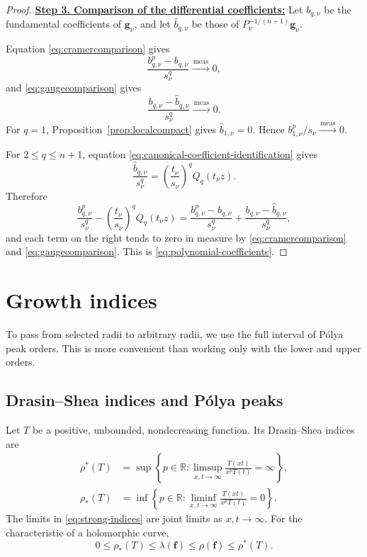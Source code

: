 \documentclass[12pt,letterpaper,reqno]{amsart}
\theoremstyle{definition}
\numberwithin{equation}{section}
\newcommand{\R}{\mathbb R}
\newcommand{\convmeas}{\xrightarrow{\,\mathrm{meas}\,}}
\newcommand{\fv}{\bm f}
\newcommand{\gv}{\bm g}
\begin{document}
\begin{proof}
\medskip\noindent
\textbf{\underline{Step 3. Comparison of the differential coefficients:}}
Let \(b_{q,\nu}\) be the fundamental coefficients of \(\gv_\nu\), and
let \(\widehat b_{q,\nu}\) be those of
\(P_\nu^{-1/(n+1)}\gv_\nu\).

Equation \eqref{eq:cramercomparison} gives
\[
 \frac{b_{q,\nu}^p-b_{q,\nu}}{s_\nu^q}
 \convmeas0,
\]
and \eqref{eq:gaugecomparison} gives
\[
 \frac{b_{q,\nu}-\widehat b_{q,\nu}}{s_\nu^q}
 \convmeas0.
\]
For \(q=1\), Proposition~\ref{prop:localcompact} gives
\(\widehat b_{1,\nu}=0\). Hence
\(b_{1,\nu}^p/s_\nu\convmeas0\).

For \(2\leq q\leq n+1\), equation
\eqref{eq:canonical-coefficient-identification} gives
\[
 \frac{\widehat b_{q,\nu}}{s_\nu^q}
 =
 \left(\frac{t_\nu}{s_\nu}\right)^qQ_q(t_\nu z).
\]
Therefore
\[
 \frac{b_{q,\nu}^p}{s_\nu^q}
 -
 \left(\frac{t_\nu}{s_\nu}\right)^qQ_q(t_\nu z)
 =
 \frac{b_{q,\nu}^p-b_{q,\nu}}{s_\nu^q}
 +
 \frac{b_{q,\nu}-\widehat b_{q,\nu}}{s_\nu^q},
\]
and each term on the right tends to zero in measure by
\eqref{eq:cramercomparison} and \eqref{eq:gaugecomparison}. This is
\eqref{eq:polynomial-coefficients}.
\end{proof}
\section{Growth indices}\label{sec:indices}

To pass from selected radii to arbitrary radii, we use the full interval
of P\'olya peak orders. This is more convenient than working only with
the lower and upper orders.

\subsection{Drasin--Shea indices and P\'olya peaks}
\label{sec:polya-peaks}

Let \(T\) be a positive, unbounded, nondecreasing function. Its
Drasin--Shea indices \cite{DS72} are
\begin{equation}\label{eq:strong-indices}
\begin{split}
 \rho^*(T)
 &=
 \sup\left\{
 p\in\R:
 \limsup_{x,t\to\infty}
 \frac{T(xt)}{x^pT(t)}
 =
 \infty
 \right\},\\
 \rho_*(T)
 &=
 \inf\left\{
 p\in\R:
 \liminf_{x,t\to\infty}
 \frac{T(xt)}{x^pT(t)}
 =
 0
 \right\}.
\end{split}
\end{equation}
The limits in \eqref{eq:strong-indices} are joint limits as
\(x,t\to\infty\). For the characteristic of a holomorphic curve,
\[
0\leq
\rho_*(T)
\leq
\lambda(\fv)
\leq
\rho(\fv)
\leq
\rho^*(T).
\]
\end{document}
